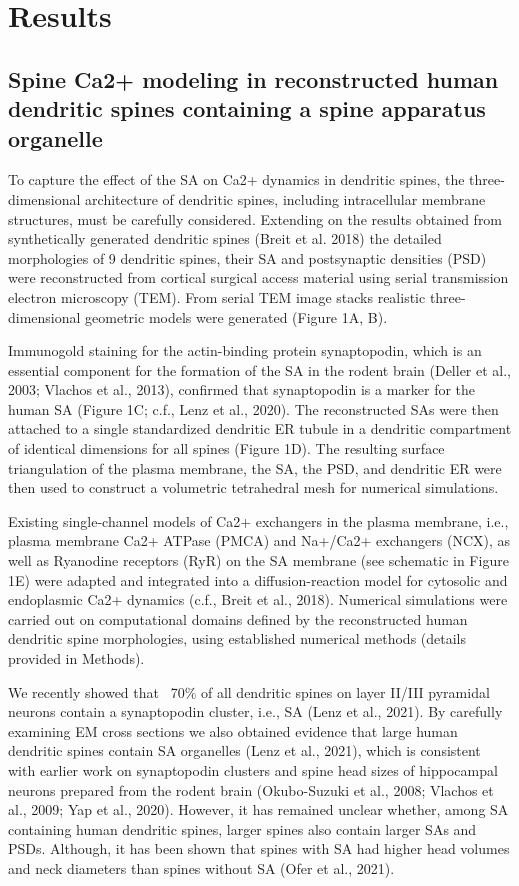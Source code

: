 \documentclass[fleqn,10pt]{wlscirep}
\begin{document}
\section*{Results}
\subsection*{Spine Ca2+ modeling in reconstructed human dendritic spines containing a spine apparatus organelle}
To capture the effect of the SA on Ca2+ dynamics in dendritic spines, the three-dimensional architecture of dendritic spines, including intracellular membrane structures, must be carefully considered. Extending on the results obtained from synthetically generated dendritic spines (Breit et al. 2018) the detailed morphologies of 9 dendritic spines, their SA and postsynaptic densities (PSD) were reconstructed from cortical surgical access material using serial transmission electron microscopy (TEM). From serial TEM image stacks realistic three-dimensional geometric models were generated (Figure 1A, B).

Immunogold staining for the actin-binding protein synaptopodin, which is an essential component for the formation of the SA in the rodent brain (Deller et al., 2003; Vlachos et al., 2013), confirmed that synaptopodin is a marker for the human SA (Figure 1C; c.f., Lenz et al., 2020). The reconstructed SAs were then attached to a single standardized dendritic ER tubule in a dendritic compartment of identical dimensions for all spines (Figure 1D). The resulting surface triangulation of the plasma membrane, the SA, the PSD, and dendritic ER were then used to construct a volumetric tetrahedral mesh for numerical simulations. 

Existing single-channel models of Ca2+ exchangers in the plasma membrane, i.e., plasma membrane Ca2+ ATPase (PMCA) and Na+/Ca2+ exchangers (NCX), as well as Ryanodine receptors (RyR) on the SA membrane (see schematic in Figure 1E) were adapted and integrated into a diffusion-reaction model for cytosolic and endoplasmic Ca2+ dynamics (c.f., Breit et al., 2018). Numerical simulations were carried out on computational domains defined by the reconstructed human dendritic spine morphologies, using established numerical methods (details provided in Methods).

We recently showed that ~70\% of all dendritic spines on layer II/III pyramidal neurons contain a synaptopodin cluster, i.e., SA (Lenz et al., 2021). By carefully examining EM cross sections we also obtained evidence that large human dendritic spines contain SA organelles (Lenz et al., 2021), which is consistent with earlier work on synaptopodin clusters and spine head sizes of hippocampal neurons prepared from the rodent brain (Okubo-Suzuki et al., 2008; Vlachos et al., 2009; Yap et al., 2020). However, it has remained unclear whether, among SA containing human dendritic spines, larger spines also contain larger SAs and PSDs. Although, it has been shown that spines with SA had higher head volumes and neck diameters than spines without SA (Ofer et al., 2021). 
\end{document}
